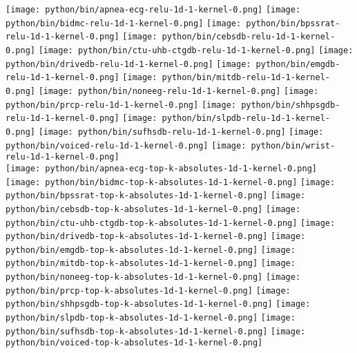 \documentclass[journal]{IEEEtran}
\begin{document}
\begin{figure*}[!t]
	\centering
	\texttt{[image: python/bin/apnea-ecg-relu-1d-1-kernel-0.png]}
	\texttt{[image: python/bin/bidmc-relu-1d-1-kernel-0.png]}
	\texttt{[image: python/bin/bpssrat-relu-1d-1-kernel-0.png]}
	\texttt{[image: python/bin/cebsdb-relu-1d-1-kernel-0.png]}
	\texttt{[image: python/bin/ctu-uhb-ctgdb-relu-1d-1-kernel-0.png]}
	\texttt{[image: python/bin/drivedb-relu-1d-1-kernel-0.png]}
	\texttt{[image: python/bin/emgdb-relu-1d-1-kernel-0.png]}
	\texttt{[image: python/bin/mitdb-relu-1d-1-kernel-0.png]}
	\texttt{[image: python/bin/noneeg-relu-1d-1-kernel-0.png]}
	\texttt{[image: python/bin/prcp-relu-1d-1-kernel-0.png]}
	\texttt{[image: python/bin/shhpsgdb-relu-1d-1-kernel-0.png]}
	\texttt{[image: python/bin/slpdb-relu-1d-1-kernel-0.png]}
	\texttt{[image: python/bin/sufhsdb-relu-1d-1-kernel-0.png]}
	\texttt{[image: python/bin/voiced-relu-1d-1-kernel-0.png]}
	\texttt{[image: python/bin/wrist-relu-1d-1-kernel-0.png]}
	\\
	\texttt{[image: python/bin/apnea-ecg-top-k-absolutes-1d-1-kernel-0.png]}
	\texttt{[image: python/bin/bidmc-top-k-absolutes-1d-1-kernel-0.png]}
	\texttt{[image: python/bin/bpssrat-top-k-absolutes-1d-1-kernel-0.png]}
	\texttt{[image: python/bin/cebsdb-top-k-absolutes-1d-1-kernel-0.png]}
	\texttt{[image: python/bin/ctu-uhb-ctgdb-top-k-absolutes-1d-1-kernel-0.png]}
	\texttt{[image: python/bin/drivedb-top-k-absolutes-1d-1-kernel-0.png]}
	\texttt{[image: python/bin/emgdb-top-k-absolutes-1d-1-kernel-0.png]}
	\texttt{[image: python/bin/mitdb-top-k-absolutes-1d-1-kernel-0.png]}
	\texttt{[image: python/bin/noneeg-top-k-absolutes-1d-1-kernel-0.png]}
	\texttt{[image: python/bin/prcp-top-k-absolutes-1d-1-kernel-0.png]}
	\texttt{[image: python/bin/shhpsgdb-top-k-absolutes-1d-1-kernel-0.png]}
	\texttt{[image: python/bin/slpdb-top-k-absolutes-1d-1-kernel-0.png]}
	\texttt{[image: python/bin/sufhsdb-top-k-absolutes-1d-1-kernel-0.png]}
	\texttt{[image: python/bin/voiced-top-k-absolutes-1d-1-kernel-0.png]}

\end{figure*}
\end{document}
